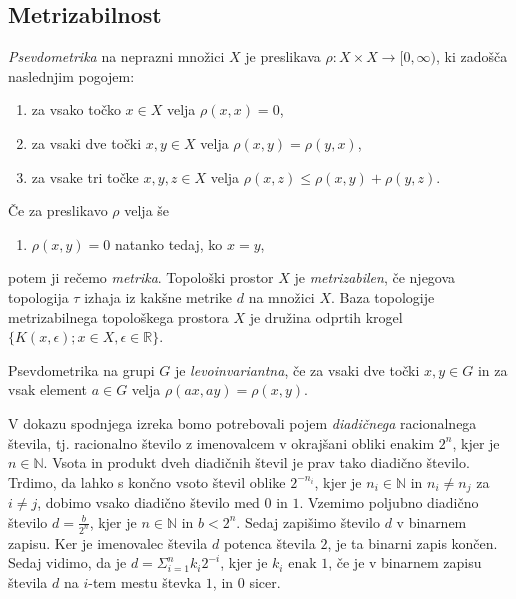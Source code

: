 \documentclass[mat1]{fmfdelo}
\newcommand{\R}{\mathbb R}
\newcommand{\N}{\mathbb N}
\begin{document}
\subsection{Metrizabilnost}
\emph{Psevdometrika} na neprazni množici $X$ je preslikava $\rho\colon X\times X \to  [0, \infty)$, ki zadošča naslednjim pogojem:
\begin{enumerate}
\item za vsako točko $x \in X$ velja $\rho (x, x) = 0$,
\item za vsaki dve točki $x, y \in X$ velja $\rho (x, y) = \rho (y, x)$,
\item za vsake tri točke $x, y, z \in X$ velja $\rho (x, z) \leq \rho (x, y) + \rho (y, z)$.
\end{enumerate}
Če za preslikavo $\rho$ velja še
\begin{enumerate}[resume]
\item $\rho(x,y) = 0$ natanko tedaj, ko $x = y$,
\end{enumerate}
potem ji rečemo \emph{metrika}.
Topološki prostor $X$ je \emph{metrizabilen}, če njegova topologija $\tau$ izhaja iz kakšne metrike $d$ na množici $X$.
Baza topologije metrizabilnega topološkega prostora $X$ je družina odprtih krogel $\lbrace K(x, \epsilon); x \in X, \epsilon \in \R \rbrace$.

\begin{definicija}
Psevdometrika na grupi $G$ je \emph{levoinvariantna}, če za vsaki dve točki $x, y \in G$ in za vsak element $a \in G$ velja $\rho(ax, ay) = \rho(x, y)$.
\end{definicija}

V dokazu spodnjega izreka bomo potrebovali pojem \emph{diadičnega} racionalnega števila, tj. racionalno število z imenovalcem v okrajšani obliki enakim $2^n$, kjer je $n \in \N$. Vsota in produkt dveh diadičnih števil je prav tako diadično število. Trdimo, da lahko s končno vsoto števil oblike $2^{-n_i}$, kjer je $n_i \in \N$ in $n_i \neq n_j$ za $i \neq j$, dobimo vsako diadično število med $0$ in $1$.
Vzemimo poljubno diadično število $d = \frac{b}{2^n}$, kjer je $n \in \N$ in $b < 2^n$. Sedaj zapišimo število $d$ v binarnem zapisu. Ker je imenovalec števila $d$ potenca števila $2$, je ta binarni zapis končen. Sedaj vidimo, da je $d = \Sigma_{i=1}^n k_i2^{-i}$, kjer je $k_i$ enak $1$, če je v binarnem zapisu števila $d$ na $i$-tem mestu števka $1$, in $0$ sicer. 
\end{document}
